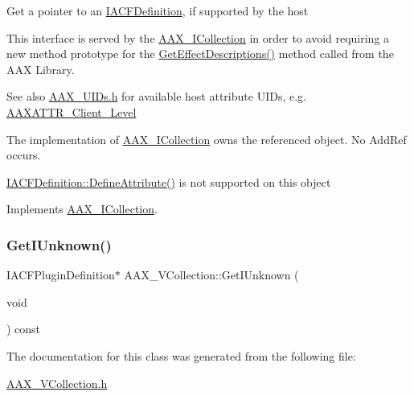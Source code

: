 Get a pointer to an \mbox{\hyperlink{a01413}{I\+A\+C\+F\+Definition}}, if supported by the host

This interface is served by the \mbox{\hyperlink{a01777}{A\+A\+X\+\_\+\+I\+Collection}} in order to avoid requiring a new method prototype for the \mbox{\hyperlink{a00796_gae0d356eef326f77cbb972e48946d4892}{Get\+Effect\+Descriptions()}} method called from the A\+AX Library.

\begin{DoxySeeAlso}{See also}
\mbox{\hyperlink{a00683}{A\+A\+X\+\_\+\+U\+I\+Ds.\+h}} for available host attribute U\+I\+Ds, e.\+g. \mbox{\hyperlink{a00683_a1bbc82d62cf23079e92826874381a891}{A\+A\+X\+A\+T\+T\+R\+\_\+\+Client\+\_\+\+Level}}
\end{DoxySeeAlso}
The implementation of \mbox{\hyperlink{a01777}{A\+A\+X\+\_\+\+I\+Collection}} owns the referenced object. No Add\+Ref occurs.

\mbox{\hyperlink{a01413_abf9f28b14b95f0835857a9096d108989}{I\+A\+C\+F\+Definition\+::\+Define\+Attribute()}} is not supported on this object 

Implements \mbox{\hyperlink{a01777_a8346a9084bf81e1834990aec2685640b}{A\+A\+X\+\_\+\+I\+Collection}}.

\mbox{\label{a01897_ae4e62289bf77a6bf9ac23de10fc3a299}} 
\subsubsection{\texorpdfstring{GetIUnknown()}{GetIUnknown()}}
{\footnotesize\ttfamily I\+A\+C\+F\+Plugin\+Definition$\ast$ A\+A\+X\+\_\+\+V\+Collection\+::\+Get\+I\+Unknown (\begin{DoxyParamCaption}\item[{void}]{ }\end{DoxyParamCaption}) const}



The documentation for this class was generated from the following file\+:\begin{DoxyCompactItemize}
\item 
\mbox{\hyperlink{a00692}{A\+A\+X\+\_\+\+V\+Collection.\+h}}\end{DoxyCompactItemize}
